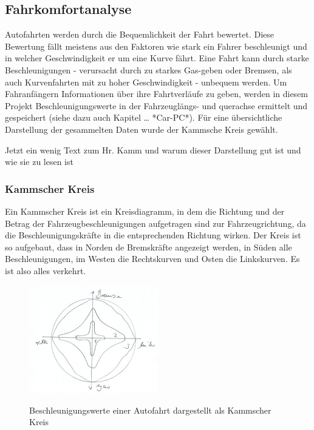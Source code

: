 \subsection{Fahrkomfortanalyse}


Autofahrten werden durch die Bequemlichkeit der Fahrt bewertet. 
Diese Bewertung fällt meistens aus den Faktoren wie stark ein Fahrer beschleunigt und in welcher Geschwindigkeit er um eine Kurve fährt. Eine Fahrt kann durch starke Beschleunigungen - verursacht durch zu  starkes Gas-geben oder Bremsen, als auch Kurvenfahrten mit zu hoher Geschwindigkeit - unbequem werden. Um Fahranfängern Informationen über ihre Fahrtverläufe zu geben, werden in diesem Projekt Beschleunigungswerte in der Fahrzeuglängs- und querachse ermittelt und gespeichert (siehe dazu auch Kapitel … *Car-PC*). Für eine übersichtliche Darstellung der gesammelten Daten wurde der Kammsche Kreis gewählt.



Jetzt ein wenig Text zum Hr. Kamm und warum dieser Darstellung gut ist und wie sie zu lesen ist

\subsubsection{Kammscher Kreis }
Ein Kammscher Kreis ist ein Kreisdiagramm, in dem die Richtung und der Betrag der Fahrzeugbeschleunigungen aufgetragen sind zur Fahrzeugrichtung, da die Beschleunigungskräfte in die entsprechenden Richtung wirken.
Der Kreis ist so aufgebaut, dass in Norden de Bremskräfte angezeigt werden, in Süden alle Beschleunigungen, im Westen die Rechtskurven und Osten die Linkskurven.
Es ist also alles verkehrt.
\begin{figure}[!htb]\centering
	\includegraphics[width=0.5\textwidth]{images/kammsherkreis}
	\caption{Beschleunigungswerte einer Autofahrt dargestellt als Kammscher Kreis} \cite{FAIF.CH3-fahrkomfortanalyse.KammscherKreis}\label{Fig:Kammsher-Kreis}
\end{figure}

